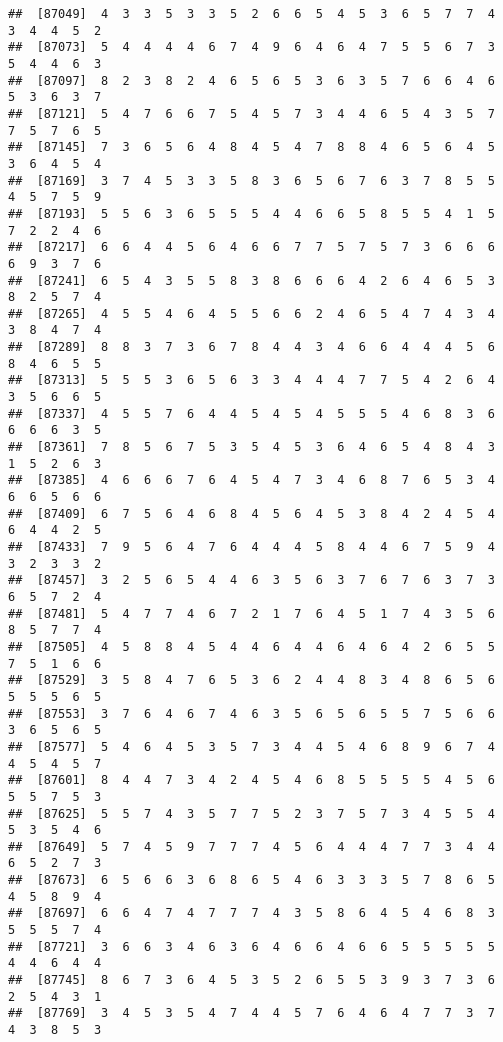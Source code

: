 \documentclass[
]{book}
\begin{document}
\begin{verbatim}
##  [87049]  4  3  3  5  3  3  5  2  6  6  5  4  5  3  6  5  7  7  4  3  4  4  5  2
##  [87073]  5  4  4  4  4  6  7  4  9  6  4  6  4  7  5  5  6  7  3  5  4  4  6  3
##  [87097]  8  2  3  8  2  4  6  5  6  5  3  6  3  5  7  6  6  4  6  5  3  6  3  7
##  [87121]  5  4  7  6  6  7  5  4  5  7  3  4  4  6  5  4  3  5  7  7  5  7  6  5
##  [87145]  7  3  6  5  6  4  8  4  5  4  7  8  8  4  6  5  6  4  5  3  6  4  5  4
##  [87169]  3  7  4  5  3  3  5  8  3  6  5  6  7  6  3  7  8  5  5  4  5  7  5  9
##  [87193]  5  5  6  3  6  5  5  5  4  4  6  6  5  8  5  5  4  1  5  7  2  2  4  6
##  [87217]  6  6  4  4  5  6  4  6  6  7  7  5  7  5  7  3  6  6  6  6  9  3  7  6
##  [87241]  6  5  4  3  5  5  8  3  8  6  6  6  4  2  6  4  6  5  3  8  2  5  7  4
##  [87265]  4  5  5  4  6  4  5  5  6  6  2  4  6  5  4  7  4  3  4  3  8  4  7  4
##  [87289]  8  8  3  7  3  6  7  8  4  4  3  4  6  6  4  4  4  5  6  8  4  6  5  5
##  [87313]  5  5  5  3  6  5  6  3  3  4  4  4  7  7  5  4  2  6  4  3  5  6  6  5
##  [87337]  4  5  5  7  6  4  4  5  4  5  4  5  5  5  4  6  8  3  6  6  6  6  3  5
##  [87361]  7  8  5  6  7  5  3  5  4  5  3  6  4  6  5  4  8  4  3  1  5  2  6  3
##  [87385]  4  6  6  6  7  6  4  5  4  7  3  4  6  8  7  6  5  3  4  6  6  5  6  6
##  [87409]  6  7  5  6  4  6  8  4  5  6  4  5  3  8  4  2  4  5  4  6  4  4  2  5
##  [87433]  7  9  5  6  4  7  6  4  4  4  5  8  4  4  6  7  5  9  4  3  2  3  3  2
##  [87457]  3  2  5  6  5  4  4  6  3  5  6  3  7  6  7  6  3  7  3  6  5  7  2  4
##  [87481]  5  4  7  7  4  6  7  2  1  7  6  4  5  1  7  4  3  5  6  8  5  7  7  4
##  [87505]  4  5  8  8  4  5  4  4  6  4  4  6  4  6  4  2  6  5  5  7  5  1  6  6
##  [87529]  3  5  8  4  7  6  5  3  6  2  4  4  8  3  4  8  6  5  6  5  5  5  6  5
##  [87553]  3  7  6  4  6  7  4  6  3  5  6  5  6  5  5  7  5  6  6  3  6  5  6  5
##  [87577]  5  4  6  4  5  3  5  7  3  4  4  5  4  6  8  9  6  7  4  4  5  4  5  7
##  [87601]  8  4  4  7  3  4  2  4  5  4  6  8  5  5  5  5  4  5  6  5  5  7  5  3
##  [87625]  5  5  7  4  3  5  7  7  5  2  3  7  5  7  3  4  5  5  4  5  3  5  4  6
##  [87649]  5  7  4  5  9  7  7  7  4  5  6  4  4  4  7  7  3  4  4  6  5  2  7  3
##  [87673]  6  5  6  6  3  6  8  6  5  4  6  3  3  3  5  7  8  6  5  4  5  8  9  4
##  [87697]  6  6  4  7  4  7  7  7  4  3  5  8  6  4  5  4  6  8  3  5  5  5  7  4
##  [87721]  3  6  6  3  4  6  3  6  4  6  6  4  6  6  5  5  5  5  5  4  4  6  4  4
##  [87745]  8  6  7  3  6  4  5  3  5  2  6  5  5  3  9  3  7  3  6  2  5  4  3  1
##  [87769]  3  4  5  3  5  4  7  4  4  5  7  6  4  6  4  7  7  3  7  4  3  8  5  3

\end{verbatim}
\end{document}
